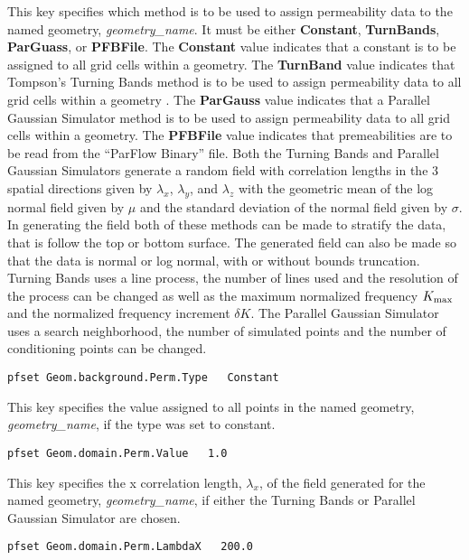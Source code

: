 {
This key specifies which method is to be used to assign permeability
data to the named geometry, {\em geometry\_name}.  It must be either
{\bf Constant}, {\bf TurnBands}, {\bf ParGuass}, or {\bf PFBFile}.  The
{\bf Constant} value indicates that a constant is to be assigned to all
grid cells within a geometry.  The {\bf TurnBand} value indicates that
Tompson's Turning Bands method is to be used to assign permeability data
to all grid cells within a geometry \cite{TAG89}.
The {\bf ParGauss} value indicates
that a Parallel Gaussian Simulator method is to be used to assign
permeability data to all grid cells within a geometry.  The
{\bf PFBFile} value indicates that premeabilities are to be read from
the ``ParFlow Binary'' file.  Both the Turning Bands and Parallel
Gaussian Simulators generate a random field with correlation lengths
in the $3$ spatial directions given by $\lambda_x$, $\lambda_y$, and
$\lambda_z$ with the geometric mean of the log normal field given by
$\mu$ and the standard deviation of the normal field given by $\sigma$.
In generating the field both of these methods can be made to stratify
the data, that is follow the top or bottom surface.  The generated field
can also be made so that the data is normal or log normal, with or
without bounds truncation.  Turning Bands uses a line process, the
number of lines used and the resolution of the process can be changed as
well as the maximum normalized frequency $K_{\rm max}$ and the normalized
frequency increment $\delta K$.  The Parallel Gaussian Simulator uses
a search neighborhood, the number of simulated points and the number of
conditioning points can be changed.
}
\begin{display}\begin{verbatim}
pfset Geom.background.Perm.Type   Constant
\end{verbatim}\end{display}

{
This key specifies the value assigned to all points in the named
geometry, {\em geometry\_name}, if the type was set to constant.
}
\begin{display}\begin{verbatim}
pfset Geom.domain.Perm.Value   1.0
\end{verbatim}\end{display}

{
This key specifies the x correlation length, $\lambda_x$, of the field
generated for the named geometry, {\em geometry\_name},
if either the Turning Bands or Parallel Gaussian Simulator are
chosen.
}
\begin{display}\begin{verbatim}
pfset Geom.domain.Perm.LambdaX   200.0
\end{verbatim}\end{display}

